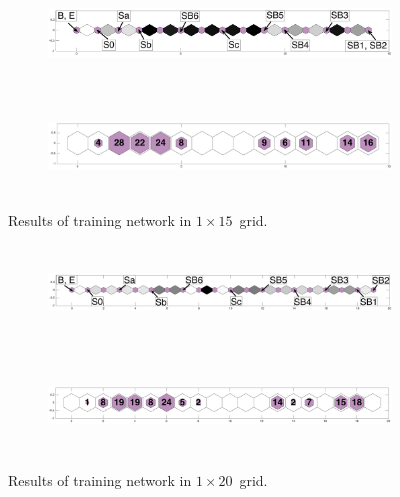     \begin{figure}
        \begin{subfigure}[b]{0.5\textwidth}
            \centering
            \includegraphics[width=\textwidth,height=2.5cm]{../images0.01/1d/apps/dist_1_by_15.png}
        \end{subfigure}
        \hfill
        \begin{subfigure}[b]{0.5\textwidth}
             \includegraphics[width=\textwidth,height=2.5cm]{../images0.01/1d/apps/hit_v_1_by_15.png}
        \end{subfigure}
                \caption{Results of training network in $1\times15$~grid.}
         \label{fig: 1by15T}
    \end{figure}

    \begin{figure}
        \begin{subfigure}[b]{0.5\textwidth}
            \centering
            \includegraphics[width=\textwidth,height=2.5cm]{../images0.01/1d/apps/dist_1_by_20.png}
        \end{subfigure}
        \hfill
        \begin{subfigure}[b]{0.5\textwidth}
             \includegraphics[width=\textwidth,height=2.5cm]{../images0.01/1d/apps/hit_v_1_by_20.png}
        \end{subfigure}
                \caption{Results of training network in $1\times20$~grid.}
         \label{fig: 1by20T}
    \end{figure}
    

